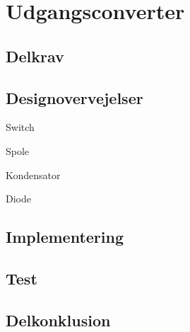 \documentclass[../main.tex]{subfiles}
\begin{document}
                    
\section{Udgangsconverter}
        
    \subsection{Delkrav}
        
    \subsection{Designovervejelser}
            
            Switch

            Spole

            Kondensator

            Diode


            
    \subsection{Implementering}
        
    \subsection{Test}
        
    \subsection{Delkonklusion}
        
        
\end{document}
